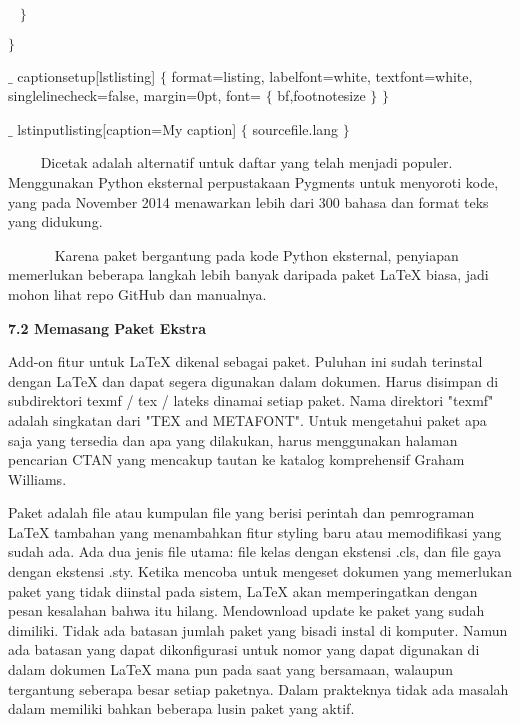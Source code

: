 {\fontsize{10pt}{10pt}\selectfont ~  $ \} $ }\par

{\fontsize{10pt}{10pt}\selectfont  $ \} $ }\par

{\fontsize{10pt}{10pt}\selectfont  $ \_ $ captionsetup[lstlisting] $ \{ $  format=listing, labelfont=white, textfont=white, singlelinecheck=false, margin=0pt, font= $ \{ $ bf,footnotesize $ \} $   $ \} $ }\par

{\fontsize{10pt}{10pt}\selectfont  $ \_ $ lstinputlisting[caption=My caption] $ \{ $ sourcefile.lang $ \} $ }\par

\vspace{12pt}
\noindent ~~~~ Dicetak adalah alternatif untuk daftar yang telah menjadi populer. Menggunakan Python eksternal perpustakaan Pygments untuk menyoroti kode, yang pada November 2014 menawarkan lebih dari 300 bahasa dan format teks yang didukung.

~~~~~~ Karena paket bergantung pada kode Python eksternal, penyiapan memerlukan beberapa langkah lebih banyak daripada paket LaTeX biasa, jadi mohon lihat repo GitHub dan manualnya.\par

\vspace{12pt}
\noindent \textbf{7.2 Memasang Paket Ekstra}\par
Add-on fitur untuk LaTeX dikenal sebagai paket. Puluhan ini sudah terinstal dengan LaTeX dan dapat segera digunakan dalam dokumen. Harus disimpan di subdirektori texmf / tex / lateks dinamai setiap paket. Nama direktori "texmf" adalah singkatan dari "TEX and METAFONT". Untuk mengetahui paket apa saja yang tersedia dan apa yang dilakukan, harus menggunakan halaman pencarian CTAN yang mencakup tautan ke katalog komprehensif Graham Williams.\par

Paket adalah file atau kumpulan file yang berisi perintah dan pemrograman LaTeX tambahan yang menambahkan fitur styling baru atau memodifikasi yang sudah ada. Ada dua jenis file utama: file kelas dengan ekstensi .cls, dan file gaya dengan ekstensi .sty. Ketika mencoba untuk mengeset dokumen yang memerlukan paket yang tidak diinstal pada sistem, LaTeX akan memperingatkan dengan pesan kesalahan bahwa itu hilang. Mendownload update ke paket yang sudah dimiliki. Tidak ada batasan jumlah paket yang bisadi instal di komputer. Namun ada batasan yang dapat dikonfigurasi untuk nomor yang dapat digunakan di dalam dokumen LaTeX mana pun pada saat yang bersamaan, walaupun tergantung seberapa besar setiap paketnya. Dalam prakteknya tidak ada masalah dalam memiliki bahkan beberapa lusin paket yang aktif.\par

